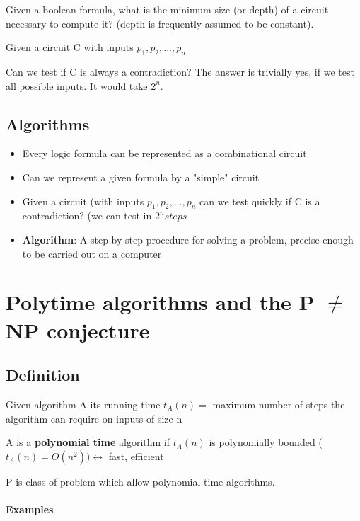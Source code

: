 \documentclass[9pt, letterpaper, oneside]{article}
\newcommand*\dbl{\leftrightarrow}
\begin{document}
Given a boolean formula, what is the minimum size (or depth) of a circuit necessary to compute it?
(depth is frequently assumed to be constant).

Given a circuit C with inputs $p_1, p_2, ..., p_n$

Can we test if C is always a contradiction? The answer is trivially yes, if we test all possible inputs. It would take $2^n$.

\subsection{Algorithms}
\begin{itemize}
	\item Every logic formula can be represented as a combinational circuit
	\item Can we represent a given formula by a "simple" circuit
	\item Given a circuit (with inputs $p_1, p_2, ..., p_n$ can we test quickly if C is a contradiction? (we can test in $2^n steps$
	\item \textbf{Algorithm}: A step-by-step procedure for solving a problem, precise enough to be carried out on a computer
\end{itemize}


\section{Polytime algorithms and the P $\neq$ NP conjecture}

\subsection{Definition}
Given algorithm A its running time $t_A(n) =$ maximum number of steps the algorithm can require on inputs of size n

A is a \textbf{polynomial time} algorithm if $t_A(n)$ is polynomially bounded ($t_A(n)=O(n^2)) \dbl$ fast, efficient

P is class of problem which allow polynomial time algorithms.

\paragraph{Examples}
\end{document}
